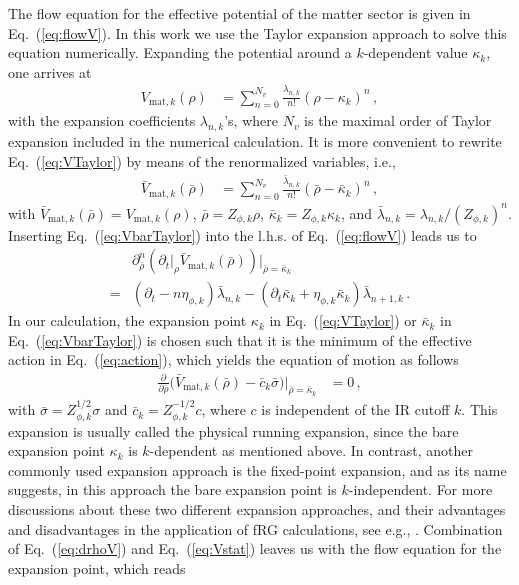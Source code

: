 \documentclass[%
reprint,
superscriptaddress,
showpacs,preprintnumbers,
amsmath,amssymb,
aps,
prd,
]{revtex4-1}
\def\Eq#1{Eq.~(\ref{#1})}
\begin{document}
The flow equation for the effective potential of the matter sector is given in \Eq{eq:flowV}. In this work we use the Taylor expansion approach to solve this equation numerically. Expanding the potential around a $k$-dependent value $\kappa_k$, one arrives at 
%
\begin{align}
V_{\mathrm{mat}, k}(\rho)&=\sum_{n=0}^{N_v}\frac{\lambda_{n,k}}{n!}(\rho-\kappa_k)^n\,, \label{eq:VTaylor}
\end{align}
%
with the expansion coefficients $\lambda_{n,k}$'s, where $N_v$ is the maximal order of Taylor expansion included in the numerical calculation. It is more convenient to rewrite \Eq{eq:VTaylor} by means of the renormalized variables, i.e.,
%
\begin{align}
\bar V_{\mathrm{mat}, k}(\bar \rho)&=\sum_{n=0}^{N_v}\frac{\bar\lambda_{n,k}}{n!}(\bar \rho-\bar \kappa_k)^n\,,\label{eq:VbarTaylor}
\end{align}
%
with $\bar V_{\mathrm{mat}, k}(\bar \rho)=V_{\mathrm{mat}, k}(\rho)$, $\bar \rho=Z_{\phi,k} \rho$, $\bar \kappa_k=Z_{\phi,k}\kappa_k$, and $\bar \lambda_{n,k}=\lambda_{n,k}/(Z_{\phi,k})^n$. Inserting \Eq{eq:VbarTaylor} into the l.h.s. of \Eq{eq:flowV} leads us to
%
\begin{align}
&\partial^n_{\bar \rho}\left(\partial_t\big|_{\rho} \bar V_{\mathrm{mat}, k}(\bar \rho)\right)\Big|_{\bar \rho=\bar \kappa_k}\nonumber\\[2ex]
=&(\partial_t -n\eta_{\phi,k})\bar{\lambda}_{n,k}-(\partial_t \bar \kappa_k+\eta_{\phi,k}\bar \kappa_k)\bar \lambda_{n+1,k}\,.\label{eq:drhoV}
\end{align}
%
In our calculation, the expansion point $\kappa_k$ in \Eq{eq:VTaylor} or $\bar \kappa_k$ in \Eq{eq:VbarTaylor} is chosen such that it is the minimum of the effective action in \Eq{eq:action}, which yields the equation of motion as follows
%
\begin{align}
\frac{\partial}{\partial \bar \rho}\Big(\bar V_{\mathrm{mat}, k}(\bar \rho)-\bar c_k
\bar \sigma \Big)\bigg \vert_{\bar\rho=\bar \kappa_k}&=0\,, \label{eq:Vstat}
\end{align}
%
with $ \bar \sigma=Z_{\phi,k}^{1/2} \sigma$ and $\bar c_k=Z_{\phi,k}^{-1/2} c$, where $c$ is independent of the IR cutoff $k$. This expansion is usually called the physical running expansion, since the bare expansion point $\kappa_k$ is $k$-dependent as mentioned above. In contrast, another commonly used expansion approach is the fixed-point expansion, and as its name suggests, in this approach the bare expansion point is $k$-independent. For more discussions about these two different expansion approaches, and their advantages and disadvantages in the application of fRG calculations, see e.g.,  \cite{Pawlowski:2014zaa,Braun:2014ata, Fu:2015naa, Rennecke:2016tkm,Yin:2019ebz}. Combination of \Eq{eq:drhoV} and \Eq{eq:Vstat} leaves us with the flow equation for the expansion point, which reads
\end{document}
